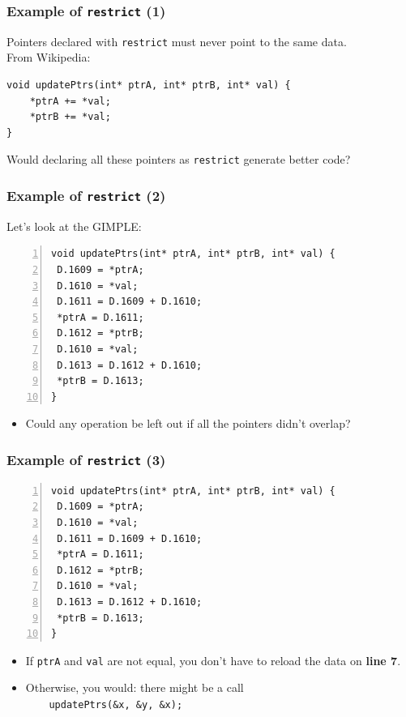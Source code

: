\begin{frame}[fragile]
  \frametitle{Example of {\tt restrict} (1)}

  
    Pointers declared with {\tt restrict} must
       never point to the same data.
~\\[1em]
    From Wikipedia:

  \begin{lstlisting}
void updatePtrs(int* ptrA, int* ptrB, int* val) {
    *ptrA += *val;
    *ptrB += *val;
}
  \end{lstlisting}
 Would declaring all these pointers as
      {\tt restrict} generate better code?
  

\end{frame}

\begin{frame}[fragile]
  \frametitle{Example of {\tt restrict} (2)}

  
    Let's look at the GIMPLE:

  \begin{lstlisting}[numbers=left]
void updatePtrs(int* ptrA, int* ptrB, int* val) {
 D.1609 = *ptrA;
 D.1610 = *val;
 D.1611 = D.1609 + D.1610;
 *ptrA = D.1611;
 D.1612 = *ptrB;
 D.1610 = *val;
 D.1613 = D.1612 + D.1610;
 *ptrB = D.1613;
}
  \end{lstlisting}

  \begin{itemize}
    \item Could any operation be left out if all the pointers
      didn't overlap?
  \end{itemize}  
  

\end{frame}

\begin{frame}[fragile]
  \frametitle{Example of {\tt restrict} (3)}

  
  \begin{lstlisting}[numbers=left]
void updatePtrs(int* ptrA, int* ptrB, int* val) {
 D.1609 = *ptrA;
 D.1610 = *val;
 D.1611 = D.1609 + D.1610;
 *ptrA = D.1611;
 D.1612 = *ptrB;
 D.1610 = *val;
 D.1613 = D.1612 + D.1610;
 *ptrB = D.1613;
}
  \end{lstlisting}
  \begin{itemize}
    \item If {\tt ptrA} and {\tt val} are not equal, you don't have to
      reload the data on {\bf line 7}.
    \item Otherwise, you would: there might be a call\\{\tt ~~~~updatePtrs(\&x, \&y,
      \&x);}
  \end{itemize}
  
\end{frame}

